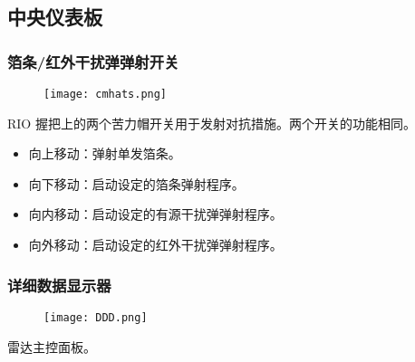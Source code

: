 \subsection{中央仪表板}

\subsubsection{箔条/红外干扰弹弹射开关}
\begin{figure}[htb]
  \center
  \texttt{[image: cmhats.png]}
\end{figure}
RIO 握把上的两个苦力帽开关用于发射对抗措施。两个开关的功能相同。

\begin{itemize}
  \item 向上移动：弹射单发箔条。
  \item 向下移动：启动设定的箔条弹射程序。
  \item 向内移动：启动设定的有源干扰弹弹射程序。
  \item 向外移动：启动设定的红外干扰弹弹射程序。
\end{itemize}

\subsubsection{详细数据显示器}
\begin{figure}[htb]
  \center
  \texttt{[image: DDD.png]}
\end{figure}
雷达主控面板。

